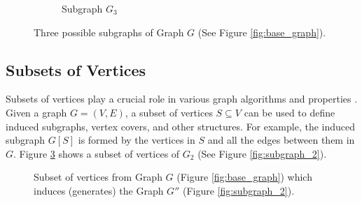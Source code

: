 \begin{figure}[!ht]
\begin{subfigure}{0.24\textwidth}
                    \caption{Subgraph $G_3$} 
                    \label{fig:subgraph_3}
                \end{subfigure}
                \hfill

                \caption{Three possible subgraphs of Graph $G$ (See Figure \ref{fig:base_graph}).}
                \label{fig:subgraphs}
            \end{figure}
        
        \subsection{Subsets of Vertices}
        
            Subsets of vertices play a crucial role in various graph algorithms and properties \cite{cormen, bondy1976graph}. Given a graph \( G = (V, E) \), a subset of vertices \( S \subseteq V \) can be used to define induced subgraphs, vertex covers, and other structures. For example, the induced subgraph \( G[S] \) is formed by the vertices in \( S \) and all the edges between them in \( G \). Figure \ref{fig:subset_of_vertices} shows a subset of vertices of $G_2$ (See Figure \ref{fig:subgraph_2}).

            \begin{figure}[!ht]
                \centering
                \caption[Subset of vertices from Graph $G$.]{Subset of vertices from Graph $G$ (Figure \ref{fig:base_graph}) which induces (generates) the Graph $G''$ (Figure \ref{fig:subgraph_2}).}
                \label{fig:subset_of_vertices}
            \end{figure}


